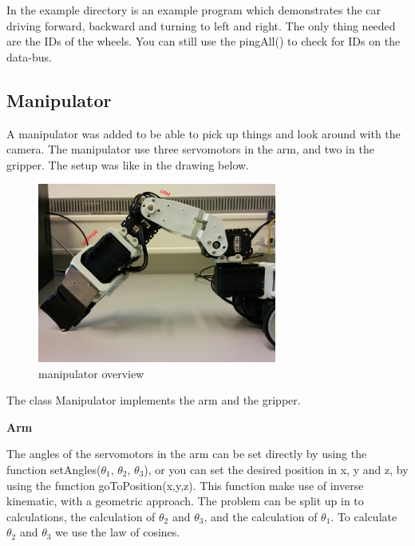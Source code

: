 In the example directory is an example program which demonstrates the car driving forward, backward and turning to left and right. The only thing needed are the IDs of the wheels. You can still use the pingAll() to check for IDs on the data-bus.

\subsection{Manipulator}

A manipulator was added to be able to pick up things and look around with the camera. The manipulator use three servomotors in the arm, and two in the gripper. The setup was like in the drawing below.

\begin{figure}[H]
    \centering
    \includegraphics[width=0.7\textwidth]{graphics/Manipulator.png}
    \caption{manipulator overview}
    \label{fig:manipulator} 
\end{figure}

The class Manipulator implements the arm and the gripper.
\bigskip

\textbf{Arm}

The angles of the servomotors in the arm can be set directly by using the function setAngles($\theta_{1}$, $\theta_{2}$, $\theta_{3}$), or you can set the desired position in x, y and z, by using the function goToPosition(x,y,z). This function make use of inverse kinematic, with a geometric approach. 
The problem can be split up in to calculations, the calculation of $\theta_{2}$ and $\theta_{3}$, and the calculation of $\theta_{1}$. To calculate $\theta_{2}$ and $\theta_{3}$ we use the law of cosines.

